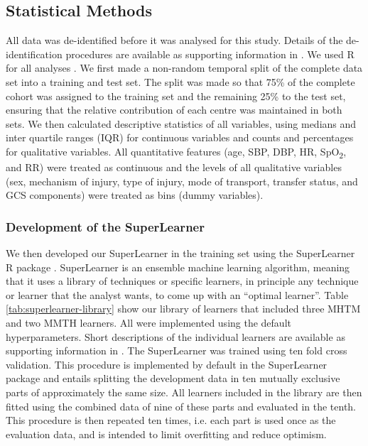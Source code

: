 \documentclass[10pt,letterpaper]{article}\usepackage[]{graphicx}\usepackage[]{color}
\begin{document}
\subsection*{Statistical Methods}
All data was de-identified before it was analysed for this study. Details of the
de-identification procedures are available as supporting information in
. We used R for all analyses \cite{R}. We first made a
non-random temporal split of the complete data set into a training and test
set. The split was made so that 75\% of the complete cohort was assigned to the
training set and the remaining 25\% to the test set, ensuring that the relative
contribution of each centre was maintained in both sets. We then calculated
descriptive statistics of all variables, using medians and inter quartile ranges
(IQR) for continuous variables and counts and percentages for qualitative
variables. All quantitative features (age, SBP, DBP, HR, SpO\textsubscript{2},
and RR) were treated as continuous and the levels of all qualitative variables
(sex, mechanism of injury, type of injury, mode of transport, transfer status,
and GCS components) were treated as bins (dummy variables).

\subsubsection*{Development of the SuperLearner}
We then developed our SuperLearner in the training set using the SuperLearner R
package \cite{SuperLearner}. SuperLearner is an ensemble machine learning
algorithm, meaning that it uses a library of techniques or specific learners, in
principle any technique or learner that the analyst wants, to come up with an
``optimal learner''. Table \ref{tab:superlearner-library} show our library of
learners that included three MHTM and two MMTH learners. All were implemented
using the default hyperparameters. Short descriptions of the individual learners
are available as supporting information in . The SuperLearner
was trained using ten fold cross validation. This procedure is implemented by
default in the SuperLearner package and entails splitting the development data
in ten mutually exclusive parts of approximately the same size. All learners
included in the library are then fitted using the combined data of nine of these
parts and evaluated in the tenth. This procedure is then repeated ten times,
i.e. each part is used once as the evaluation data, and is intended to limit
overfitting and reduce optimism.
\end{document}
